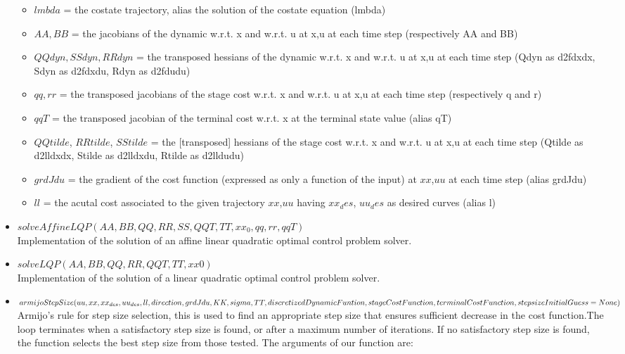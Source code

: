 \documentclass[a4paper,11pt,oneside]{book}
\begin{document}
\begin{itemize}
\begin{itemize}
        \item $lmbda$ = the costate trajectory, alias the solution of the costate equation (lmbda) 
        \item $AA, BB$ = the jacobians of the dynamic w.r.t. x and w.r.t. u at x,u at each time step (respectively AA and BB)
        \item $QQdyn, SSdyn, RRdyn$ = the transposed hessians of the dynamic w.r.t. x and w.r.t. u at x,u at each time step (Qdyn as d2fdxdx, Sdyn as d2fdxdu, Rdyn as d2fdudu)
        \item $qq, rr$ = the transposed jacobians of the stage cost w.r.t. x and w.r.t. u at x,u at each time step (respectively q and r)
        \item $qqT$ = the transposed jacobian of the terminal cost w.r.t. x at the terminal state value (alias qT)
        \item $QQtilde$, $RRtilde$, $SStilde$ = the [transposed] hessians of the stage cost w.r.t. x and w.r.t. u at x,u at each time step (Qtilde as d2lldxdx, Stilde as d2lldxdu, Rtilde as d2lldudu)
        \item $grdJdu$ = the gradient of the cost function (expressed as only a function of the input) at $xx$,$uu$ at each time step (alias grdJdu) 
        \item $ll$ = the acutal cost associated to the given trajectory $xx$,$uu$ having $xx_des$, $uu_des$ as desired curves (alias l)
    \end{itemize}
    \item $solveAffineLQP(AA, BB, QQ, RR, SS, QQT, TT, xx_0, qq, rr, qqT)$\\
    Implementation of the solution of an affine linear quadratic optimal control problem solver.
    \item $solveLQP(AA, BB, QQ, RR, QQT, TT, xx0)$\\
    Implementation of the solution of a linear quadratic optimal control problem solver.
    \item $armijoStepSize(uu, xx, xx_{des}, uu_{des}, ll, direction, grdJdu, KK, sigma,\\ TT, discretizedDynamicFuntion, stageCostFunction, terminalCostFunction,\\ stepsizeInitialGuess = None)$\\
    Armijo's rule for step size selection, this is used to find an appropriate step size that ensures sufficient decrease in the cost function.The loop terminates when a satisfactory step size is found, or after a maximum number of iterations. If no satisfactory step size is found, the function selects the best step size from those tested. The arguments of our function are:

\end{itemize}
\end{document}
